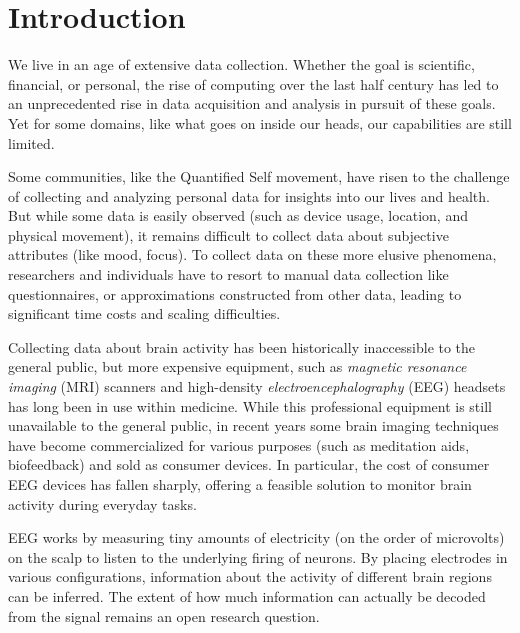 \chapter{Introduction}




We live in an age of extensive data collection. Whether the goal is scientific, financial, or personal, the rise of computing over the last half century has led to an unprecedented rise in data acquisition and analysis in pursuit of these goals. Yet for some domains, like what goes on inside our heads, our capabilities are still limited.


Some communities, like the Quantified Self movement, have risen to the challenge of collecting and analyzing personal data for insights into our lives and health. But while some data is easily observed (such as device usage, location, and physical movement), it remains difficult to collect data about subjective attributes (like mood, focus). To collect data on these more elusive phenomena, researchers and individuals have to resort to manual data collection like questionnaires, or approximations constructed from other data, leading to significant time costs and scaling difficulties.\cite{malhi_promise_2017}


Collecting data about brain activity has been historically inaccessible to the general public, but more expensive equipment, such as \emph{magnetic resonance imaging} (MRI) scanners and high-density \emph{electroencephalography} (EEG) headsets has long been in use within medicine. While this professional equipment is still unavailable to the general public, in recent years some brain imaging techniques have become commercialized for various purposes (such as meditation aids, biofeedback) and sold as consumer devices. In particular, the cost of consumer EEG devices has fallen sharply, offering a feasible solution to monitor brain activity during everyday tasks.

EEG works by measuring tiny amounts of electricity (on the order of microvolts) on the scalp to listen to the underlying firing of neurons. By placing electrodes in various configurations, information about the activity of different brain regions can be inferred. The extent of how much information can actually be decoded from the signal remains an open research question.

